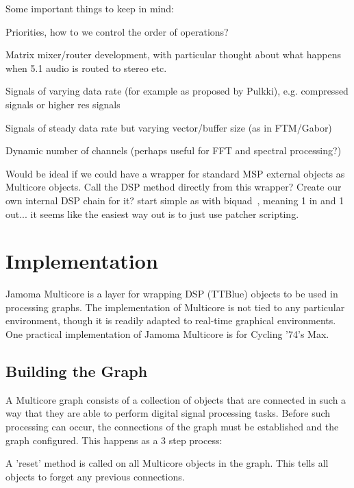 \documentclass[twoside,a4paper]{article}
\begin{document}

Some important things to keep in mind:

Priorities, how to we control the order of operations?

Matrix mixer/router development, with particular thought about what happens when 5.1 audio is routed to stereo etc.

Signals of varying data rate (for example as proposed by Pulkki), e.g. compressed signals or higher res signals

Signals of steady data rate but varying vector/buffer size (as in FTM/Gabor)

Dynamic number of channels (perhaps useful for FFT and spectral processing?)

Would be ideal if we could have a wrapper for standard MSP external objects as Multicore objects. 
Call the DSP method directly from this wrapper?
Create our own internal DSP chain for it?
start simple as with biquad~, meaning 1 in and 1 out...
it seems like the easiest way out is to just use patcher scripting.









\section{Implementation} %

Jamoma Multicore is a layer for wrapping DSP (TTBlue) objects to be used in processing graphs. The implementation of Multicore is not tied to any particular environment, though it is readily adapted to real-time graphical environments. One practical implementation of Jamoma Multicore is for Cycling '74's Max.


\subsection{Building the Graph} %

A Multicore graph consists of a collection of objects that are connected in such a way that they are able to perform digital signal processing tasks. Before such processing can occur, the connections of the graph must be established and the graph configured. This happens as a 3 step process:

A 'reset' method is called on all Multicore objects in the graph. This tells all objects to forget any previous connections.
\end{document}
